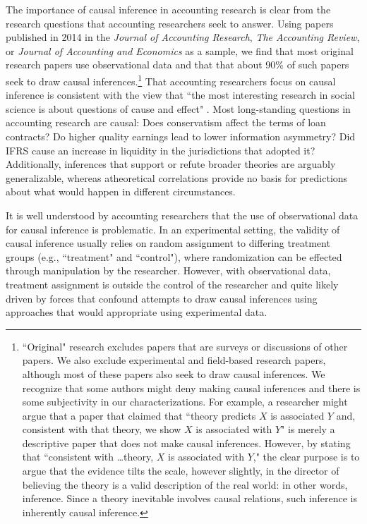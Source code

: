 \documentclass[11pt,reqno]{amsart}
\begin{document}
\begin{doublespace}
The importance of causal inference in accounting research is clear from the research questions that accounting researchers seek to answer. Using papers published in 2014 in the \textit{Journal of Accounting Research}, \textit{The Accounting Review}, or \textit{Journal of Accounting and Economics} as a sample, we find that most original research papers use observational data and that that about 90\% of such papers seek to draw causal inferences.\footnote{
 ``Original" research excludes papers that are surveys or discussions of other papers.
We also exclude experimental and field-based research papers, although most of these papers also seek to draw causal inferences. 
We recognize that some authors might deny making causal inferences and there is some subjectivity in our characterizations.
For example, a researcher might argue that a paper that claimed that ``theory predicts $X$ is associated $Y$ and, consistent with that theory, we show $X$ is associated with $Y$" is merely a descriptive paper that does not make causal inferences.
However, by stating that ``consistent with \dots theory, $X$ is associated with $Y$," the clear purpose is to argue that the
evidence tilts the scale, however slightly, in the director of believing the theory is a valid description of the real world: in other words, inference.
Since a theory inevitable involves causal relations, such inference is inherently causal inference.}
That accounting researchers focus on causal inference is consistent with the view that ``the most interesting research in social science is about questions of cause and effect" \cite[p. 3]{Angrist:2008vk}.
Most long-standing questions in accounting research are causal: 
Does conservatism affect the terms of loan contracts?
Do higher quality earnings lead to lower information asymmetry? 
Did IFRS cause an increase in liquidity in the jurisdictions that adopted it?
Additionally, inferences that support or refute broader theories are arguably generalizable, whereas atheoretical correlations provide no basis for predictions about what would happen in different circumstances.

It is well understood by accounting researchers that the use of observational data for causal inference is problematic.
In an experimental setting, the validity of causal inference usually relies on random assignment to differing treatment groups (e.g., ``treatment" and ``control"), where randomization can be effected through manipulation by the researcher. %
However, with observational data, treatment assignment is outside the control of the researcher and quite likely driven by forces that confound attempts to draw causal inferences using approaches that would appropriate using experimental data.


\end{doublespace}
\end{document}
